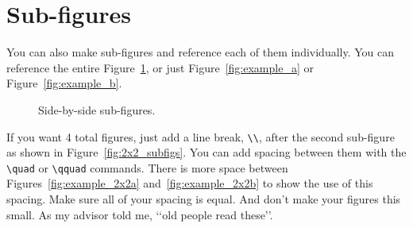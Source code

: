 \documentclass[12pt]{report}
\begin{document}
\section{Sub-figures}
You can also make sub-figures and reference each of them individually.  You can reference the entire Figure~\ref{fig:1x2_subfigs}, or just Figure~\ref{fig:example_a} or Figure~\ref{fig:example_b}.
\begin{figure}[!ht]
  \centering
   \caption{Side-by-side sub-figures.}
\label{fig:1x2_subfigs}
\end{figure}


If you want 4 total figures, just add a line break, \verb'\\', after the second sub-figure as shown in Figure~\ref{fig:2x2_subfigs}.  You can add spacing between them with the \verb'\quad' or \verb'\qquad' commands.  There is more space between Figures~\ref{fig:example_2x2a} and~\ref{fig:example_2x2b} to show the use of this spacing.  Make sure all of your spacing is equal.  And don't make your figures this small.  As my advisor told me, \lq\lq{}old people read these\rq\rq{}\cite{Mark}.
\end{document}
